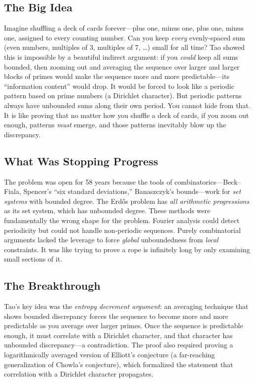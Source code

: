 \subsection{The Big Idea}
Imagine shuffling a deck of cards forever---plus one, minus one, plus one, minus one, assigned to every counting number. Can you keep \emph{every} evenly-spaced sum (even numbers, multiples of 3, multiples of 7, \ldots) small for all time? Tao showed this is impossible by a beautiful indirect argument: if you \emph{could} keep all sums bounded, then zooming out and averaging the sequence over larger and larger blocks of primes would make the sequence more and more predictable---its ``information content'' would drop. It would be forced to look like a periodic pattern based on prime numbers (a Dirichlet character). But periodic patterns always have unbounded sums along their own period. You cannot hide from that. It is like proving that no matter how you shuffle a deck of cards, if you zoom out enough, patterns \emph{must} emerge, and those patterns inevitably blow up the discrepancy.

\subsection{What Was Stopping Progress}
The problem was open for 58 years because the tools of combinatorics---Beck--Fiala, Spencer's ``six standard deviations,'' Banaszczyk's bounds---work for \emph{set systems} with bounded degree. The Erd\H{o}s problem has \emph{all arithmetic progressions} as its set system, which has unbounded degree. These methods were fundamentally the wrong shape for the problem. Fourier analysis could detect periodicity but could not handle non-periodic sequences. Purely combinatorial arguments lacked the leverage to force \emph{global} unboundedness from \emph{local} constraints. It was like trying to prove a rope is infinitely long by only examining small sections of it.

\subsection{The Breakthrough}
Tao's key idea was the \emph{entropy decrement argument}: an averaging technique that shows bounded discrepancy forces the sequence to become more and more predictable as you average over larger primes. Once the sequence is predictable enough, it must correlate with a Dirichlet character, and that character has unbounded discrepancy---a contradiction. The proof also required proving a logarithmically averaged version of Elliott's conjecture (a far-reaching generalization of Chowla's conjecture), which formalized the statement that correlation with a Dirichlet character propagates.

